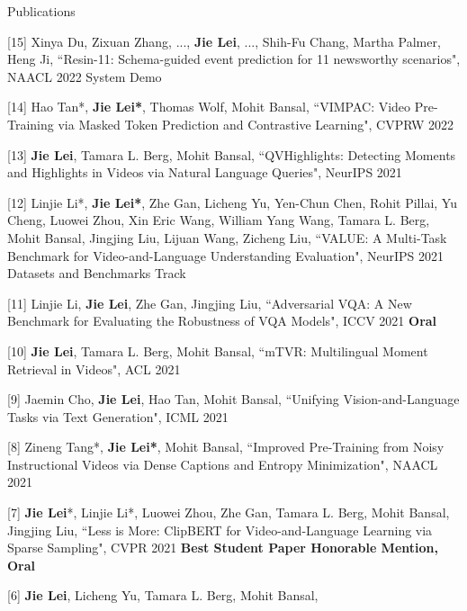 \documentclass{resume} %
\begin{document}
\begin{rSection}{Publications}
    \item {[15]
    Xinya Du, Zixuan Zhang, ..., \textbf{Jie Lei}, ..., Shih-Fu Chang, Martha Palmer, Heng Ji,
    ``Resin-11: Schema-guided event prediction for 11 newsworthy scenarios",
     NAACL 2022 System Demo
    }

    \item {[14] Hao Tan*, \textbf{Jie Lei*}, Thomas Wolf, Mohit Bansal,
            ``VIMPAC: Video Pre-Training via Masked Token Prediction and Contrastive Learning",
            CVPRW 2022
            }
    \item {[13] \textbf{Jie Lei}, Tamara L. Berg, Mohit Bansal,
            ``QVHighlights: Detecting Moments and Highlights in Videos via Natural Language Queries",
            NeurIPS 2021
            }
    \item {[12] Linjie Li*, \textbf{Jie Lei*}, Zhe Gan, Licheng Yu, Yen-Chun Chen, Rohit Pillai, Yu Cheng, Luowei Zhou, Xin Eric Wang, William Yang Wang, Tamara L. Berg, Mohit Bansal, Jingjing Liu, Lijuan Wang, Zicheng Liu,
            ``VALUE: A Multi-Task Benchmark for Video-and-Language Understanding Evaluation",
            NeurIPS 2021 Datasets and Benchmarks Track
            }
    \item {[11] Linjie Li, \textbf{Jie Lei}, Zhe Gan, Jingjing Liu,
            ``Adversarial VQA: A New Benchmark for Evaluating the Robustness of VQA Models",
            ICCV 2021 {\color{bittersweet}\textbf{Oral}}
            }
    \item {[10] \textbf{Jie Lei}, Tamara L. Berg, Mohit Bansal,
            ``mTVR: Multilingual Moment Retrieval in Videos",
            ACL 2021
            }
    \item {[9] Jaemin Cho, \textbf{Jie Lei}, Hao Tan, Mohit Bansal,
            ``Unifying Vision-and-Language Tasks via Text Generation",
            ICML 2021
            }
    \item {[8] Zineng Tang*, \textbf{Jie Lei*}, Mohit Bansal,
            ``Improved Pre-Training from Noisy Instructional Videos via Dense Captions and Entropy Minimization",
            NAACL 2021
            }
    \item {[7] \textbf{Jie Lei}*, Linjie Li*, Luowei Zhou, Zhe Gan, Tamara L. Berg, Mohit Bansal, Jingjing Liu,
            ``Less is More: ClipBERT for Video-and-Language Learning via Sparse Sampling",
            CVPR 2021 {\color{bittersweet}\textbf{Best Student Paper Honorable Mention, Oral}}
            }
    \item {[6] \textbf{Jie Lei}, Licheng Yu, Tamara L. Berg, Mohit Bansal,
}
\end{rSection}
\end{document}
